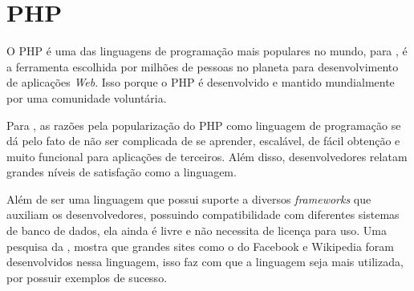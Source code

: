




\section{PHP}
O PHP é uma das linguagens de programação mais populares no mundo, para \citet[p.2]{vaswani2010}, é a ferramenta  escolhida por milhões de pessoas no planeta para desenvolvimento de aplicações \textit{Web}. Isso porque o PHP é desenvolvido e mantido mundialmente por uma comunidade voluntária. 

Para \citet[p.2]{vaswani2010}, as razões pela popularização do PHP como linguagem de programação se dá pelo fato de não ser complicada de se aprender, escalável, de fácil obtenção e muito funcional para aplicações de terceiros. Além disso, desenvolvedores relatam grandes níveis de satisfação como a linguagem.

Além de ser uma linguagem que possui suporte a diversos \textit{frameworks} que auxiliam os desenvolvedores, possuindo compatibilidade com diferentes sistemas de banco de dados, ela ainda é livre e não necessita de licença para uso. Uma pesquisa da \citet{w3techs2018}, mostra que grandes sites como o do Facebook e Wikipedia foram desenvolvidos nessa linguagem, isso faz com que a linguagem seja mais utilizada, por possuir exemplos de sucesso.

